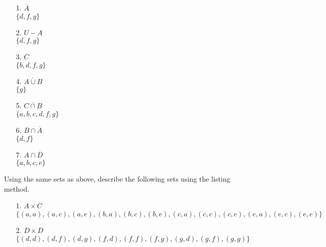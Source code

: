 \documentclass{article}
\begin{document}
\begin{itemize}
    \item[1.] $\overline{A}$\\
    {\color{blue}$\{d, f, g\}$}
    
    \item[2.] $U - A$\\
    {\color{blue}$\{d, f, g\}$}
    
    \item[3.] $\overline{C}$\\
    {\color{blue}$\{b, d, f, g\}$}
    
    \item[4.] $\overline{A \cup B}$\\
    {\color{blue}$\{g\}$}
    
    \item[5.] $\overline{C \cap B}$\\
    {\color{blue}$\{a, b, c, d, f, g\}$}
    
    \item[6.] $B \cap \overline{A}$\\
    {\color{blue}$\{d, f\}$}
    
    \item[7.] $A \cap \overline{D}$\\
    {\color{blue}$\{a, b, c, e\}$}
    
\end{itemize}

Using the same sets as above, describe the following sets using the listing method.

\begin{itemize}
    \item[1.] $A \times C$\\
    {\color{blue}$\{(a, a),(a, c),(a, e),(b, a),(b, c),(b, e),(c, a),(c, c),(c, e),(e, a),(e, c),(e, e)\}$}
    
    \item[2.] $D \times D$\\
    {\color{blue}$\{(d, d),(d, f),(d, g),(f, d),(f, f),(f, g),(g, d),(g, f),(g, g)\}$}
\end{itemize}
\end{document}
